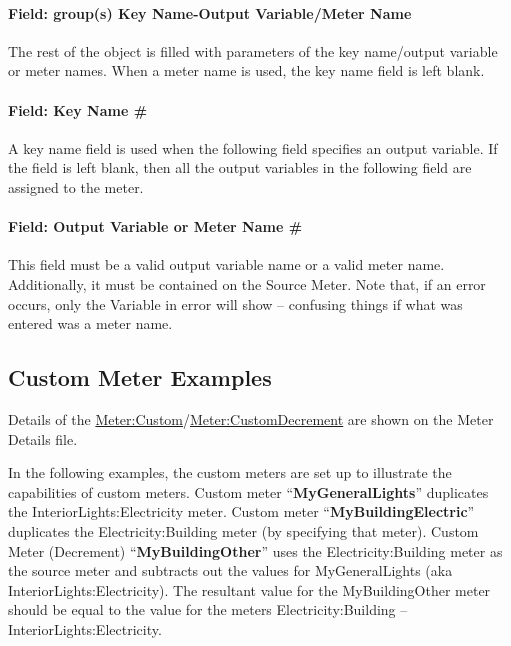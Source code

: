 \paragraph{Field: group(s) Key Name-Output Variable/Meter Name}\label{field-groups-key-name-output-variablemeter-name-1}

The rest of the object is filled with parameters of the key name/output variable or meter names. When a meter name is used, the key name field is left blank.

\paragraph{Field: Key Name \#}\label{field-key-name-1}

A key name field is used when the following field specifies an output variable. If the field is left blank, then all the output variables in the following field are assigned to the meter.

\paragraph{Field: Output Variable or Meter Name \#}\label{field-output-variable-or-meter-name-1}

This field must be a valid output variable name or a valid meter name. Additionally, it must be contained on the Source Meter. Note that, if an error occurs, only the Variable in error will show -- confusing things if what was entered was a meter name.

\subsection{Custom Meter Examples}\label{custom-meter-examples}

Details of the \hyperref[metercustom]{Meter:Custom}/\hyperref[metercustomdecrement]{Meter:CustomDecrement} are shown on the Meter Details file.

In the following examples, the custom meters are set up to illustrate the capabilities of custom meters. Custom meter ``\textbf{MyGeneralLights}'' duplicates the InteriorLights:Electricity meter. Custom meter ``\textbf{MyBuildingElectric}'' duplicates the Electricity:Building meter (by specifying that meter). Custom Meter (Decrement) ``\textbf{MyBuildingOther}'' uses the Electricity:Building meter as the source meter and subtracts out the values for MyGeneralLights (aka InteriorLights:Electricity). The resultant value for the MyBuildingOther meter should be equal to the value for the meters Electricity:Building -- InteriorLights:Electricity.


